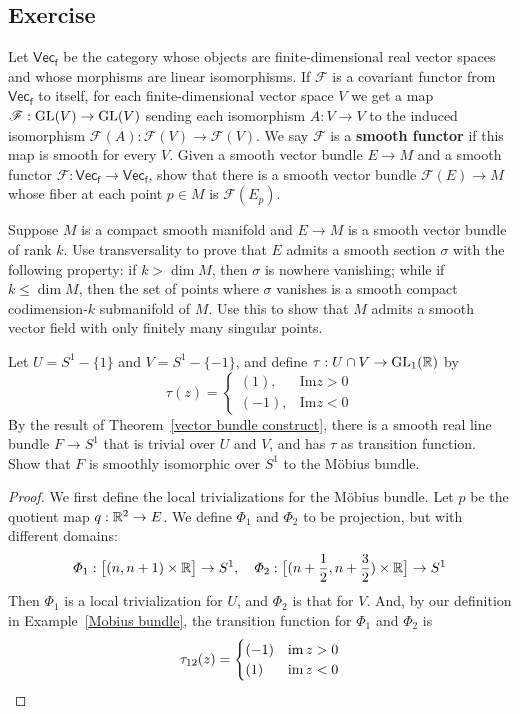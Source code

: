 \subsection{Exercise}
\begin{exercise}
Let $\mathsf{Vec_f}$ be the category whose objects are finite-dimensional real vector spaces and whose morphisms are linear isomorphisms. If $\mathscr{F}$ is a covariant functor from $\mathsf{Vec_f}$ to itself, for each finite-dimensional vector space $V$ we get a map $\mathscr{F}:\mathrm{GL}(V)\to\mathrm{GL}(V)$ sending each isomorphism $A:V\to V$ to the induced isomorphism $\mathscr{F}(A):\mathscr{F}(V)\to\mathscr{F}(V)$. We say $\mathscr{F}$ is a \textbf{smooth functor} if this map is smooth for every $V$. Given a smooth vector bundle $E\to M$ and a smooth functor $\mathscr{F}:\mathsf{Vec_f}\to\mathsf{Vec_f}$, show that there is a smooth vector bundle $\mathscr{F}(E)\to M$ whose fiber at each point $p\in M$ is $\mathscr{F}(E_p)$.
\end{exercise}
\begin{exercise}
Suppose $M$ is a compact smooth manifold and $E\to M$ is a smooth vector bundle of rank $k$. Use transversality to prove that $E$ admits a smooth section $\sigma$ with the following property: if $k>\dim M$, then $\sigma$ is nowhere vanishing; while if $k\leq\dim M$, then the set of points where $\sigma$ vanishes is a smooth compact codimension-$k$ submanifold of $M$. Use this to show that $M$ admits a smooth vector field with only finitely many singular points.
\end{exercise}
\begin{exercise}
Let $U=S^1-\{1\}$ and $V=S^1-\{-1\}$, and define $\tau:U\cap V\to\mathrm{GL}_1(\mathbb{R})$ by
\[\tau(z)=\begin{cases}
(1),&\mathrm{Im}z>0\\
(-1),&\mathrm{Im}z<0
\end{cases}\]
By the result of Theorem~\ref{vector bundle construct}, there is a smooth real line bundle $F\to S^1$ that is trivial over $U$ and $V$, and has $\tau$ as transition function. Show that $F$ is smoothly isomorphic over $S^1$ to the M\"obius bundle.
\end{exercise}
\begin{proof}
We first define the local trivializations for the M\"obius bundle. Let $p$ be the quotient map $q:\mathbb{R}^2\to E$. We define $\varPhi_1$ and $\varPhi_2$ to be projection, but with different domains:
\[\varPhi_1:\big[(n,n+1)\times\mathbb{R}\big]\to S^1,\quad \varPhi_2:\big[(n+\frac{1}{2},n+\frac{3}{2})\times\mathbb{R}\big]\to S^1\]
Then $\varPhi_1$ is a local trivialization for $U$, and $\varPhi_2$ is that for $V$. And, by our definition in Example~\ref{Mobius bundle}, the transition function for $\varPhi_1$ and $\varPhi_2$ is 
\[\tau_{12}(z)=\begin{cases}
(-1)&\mathrm{im}\, z>0\\
(1)&\mathrm{im}\, z<0
\end{cases}\]
\end{proof}
